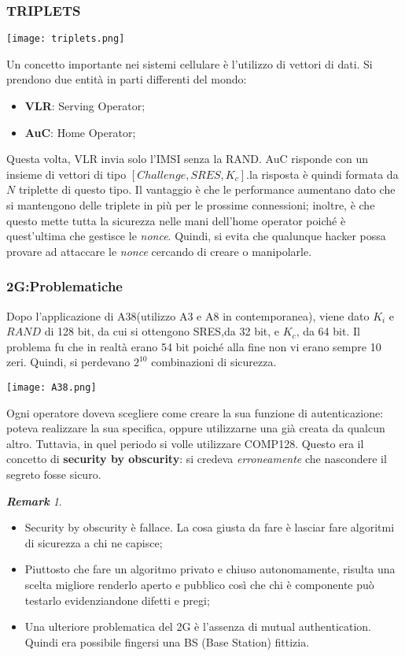 \documentclass{article}
\theoremstyle{remark}
\newtheorem*{remark}{\textbf{Remark}}
\begin{document}
\subsubsection{TRIPLETS}
\begin{center}
    \texttt{[image: triplets.png]}
\end{center}
Un concetto importante nei sistemi cellulare è l'utilizzo di vettori di dati. Si prendono due entità in parti differenti del mondo:\begin{itemize}
    \item \textbf{VLR}: Serving Operator;
    \item \textbf{AuC}: Home Operator;
\end{itemize}
Questa volta, VLR invia solo l'IMSI senza la RAND. AuC risponde con un insieme di vettori di tipo $[Challenge,SRES,K_c]$.\newline la risposta è quindi formata da $N$ triplette di questo tipo. Il vantaggio è che le performance aumentano dato che si mantengono delle triplete in più per le prossime connessioni; inoltre, è che questo mette tutta la sicurezza nelle mani dell'home operator poiché è quest'ultima che gestisce le \emph{nonce}. Quindi, si evita che qualunque hacker possa provare ad attaccare le \emph{nonce} cercando di creare o manipolarle.
\subsubsection{2G:Problematiche}
Dopo l'applicazione di A38(utilizzo A3 e A8 in contemporanea), viene dato $K_i$ e $RAND$ di 128 bit, da cui si ottengono SRES,da 32 bit, e $K_c$, da 64 bit. Il problema fu che in realtà erano 54 bit poiché alla fine non vi erano sempre 10 zeri. Quindi, si perdevano $2^{10}$ combinazioni di sicurezza.
\begin{center}
    \texttt{[image: A38.png]}
\end{center}
Ogni operatore doveva scegliere come creare la sua funzione di autenticazione: poteva realizzare la sua specifica, oppure utilizzarne una già creata da qualcun altro. Tuttavia, in quel periodo si volle utilizzare COMP128. Questo era il concetto di \textbf{security by obscurity}: si credeva \emph{erroneamente} che nascondere il segreto fosse sicuro.
\begin{remark}
\begin{itemize}
    \item Security by obscurity è fallace. La cosa giusta da fare è lasciar fare algoritmi di sicurezza a chi ne capisce;
    \item Piuttosto che fare un algoritmo privato e chiuso autonomamente, risulta una scelta migliore renderlo aperto e pubblico così che chi è componente può testarlo evidenziandone difetti e pregi;
    \item Una ulteriore problematica del 2G è l'assenza di mutual authentication. Quindi era possibile fingersi una BS (Base Station) fittizia.
\end{itemize}
\end{remark}
\end{document}
